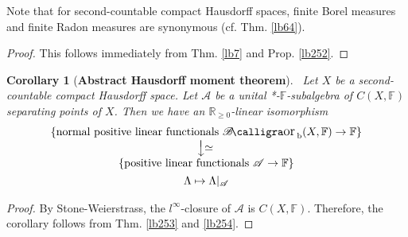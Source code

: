 \documentclass[12pt,b5paper,notitlepage]{article}
\theoremstyle{definition}
\theoremstyle{plain}
\newtheorem{co}[df]{Corollary}
\DeclareMathOperator{\Borb}{{\mathscr{B}\text{\kern -2pt {\calligra\large or}}\,}_{\mathrm b}}
\newcommand{\scr}{\mathscr}
\newcommand{\Rbb}{\mathbb R}
\newcommand{\Fbb}{\mathbb F}
\numberwithin{equation}{section}
\begin{document}
Note that for second-countable compact Hausdorff spaces, finite Borel measures and finite Radon measures are synonymous (cf. Thm. \ref{lb64}).

\begin{proof}
This follows immediately from Thm. \ref{lb7} and Prop. \ref{lb252}.
\end{proof}


\begin{co}[\textbf{Abstract Hausdorff moment theorem}]\label{lb261}\
Let $X$ be a second-countable compact Hausdorff space. Let $\scr A$ be a unital *-$\Fbb$-subalgebra of $C(X,\Fbb)$ separating points of $X$. Then we have an $\Rbb_{\geq0}$-linear isomorphism
\begin{gather}
\begin{gathered}
\begin{array}{c}
\{\text{normal positive linear functionals $\Borb(X,\Fbb)\rightarrow\Fbb$}\}\\
\raisebox{0.3cm}{\rotatebox{-90}{$\xlongrightarrow{\rotatebox{90}{$\simeq$}}$}}\\
\{\text{positive linear functionals $\scr A\rightarrow\Fbb$}\}
\end{array}
\\
\Lambda\mapsto\Lambda|_{\scr A}
\end{gathered}
\end{gather}
\end{co}

\begin{proof}
By Stone-Weierstrass, the $l^\infty$-closure of $\scr A$ is $C(X,\Fbb)$. Therefore, the corollary follows from Thm. \ref{lb253} and \ref{lb254}.
\end{proof}
\end{document}
